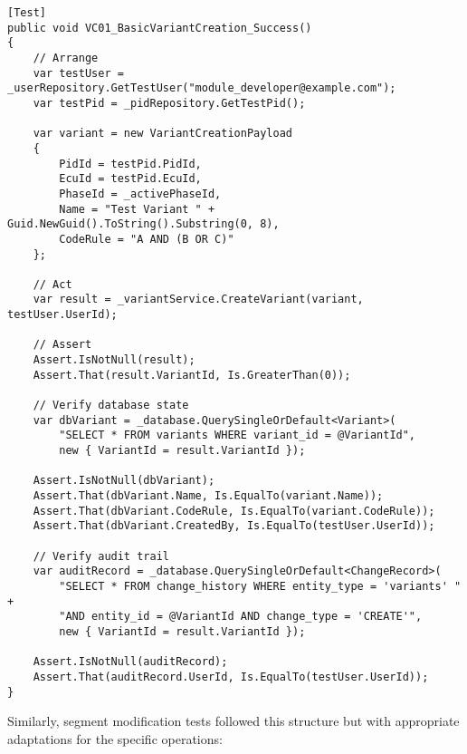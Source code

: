 \begin{lstlisting}[language=CSharp, caption={Variant Creation Test Implementation Example}, label={lst:variant-creation-test}]
[Test]
public void VC01_BasicVariantCreation_Success()
{
    // Arrange
    var testUser = _userRepository.GetTestUser("module_developer@example.com");
    var testPid = _pidRepository.GetTestPid();
    
    var variant = new VariantCreationPayload
    {
        PidId = testPid.PidId,
        EcuId = testPid.EcuId,
        PhaseId = _activePhaseId,
        Name = "Test Variant " + Guid.NewGuid().ToString().Substring(0, 8),
        CodeRule = "A AND (B OR C)"
    };
    
    // Act
    var result = _variantService.CreateVariant(variant, testUser.UserId);
    
    // Assert
    Assert.IsNotNull(result);
    Assert.That(result.VariantId, Is.GreaterThan(0));
    
    // Verify database state
    var dbVariant = _database.QuerySingleOrDefault<Variant>(
        "SELECT * FROM variants WHERE variant_id = @VariantId", 
        new { VariantId = result.VariantId });
    
    Assert.IsNotNull(dbVariant);
    Assert.That(dbVariant.Name, Is.EqualTo(variant.Name));
    Assert.That(dbVariant.CodeRule, Is.EqualTo(variant.CodeRule));
    Assert.That(dbVariant.CreatedBy, Is.EqualTo(testUser.UserId));
    
    // Verify audit trail
    var auditRecord = _database.QuerySingleOrDefault<ChangeRecord>(
        "SELECT * FROM change_history WHERE entity_type = 'variants' " +
        "AND entity_id = @VariantId AND change_type = 'CREATE'", 
        new { VariantId = result.VariantId });
    
    Assert.IsNotNull(auditRecord);
    Assert.That(auditRecord.UserId, Is.EqualTo(testUser.UserId));
}
\end{lstlisting}

Similarly, segment modification tests followed this structure but with appropriate adaptations for the specific operations:

